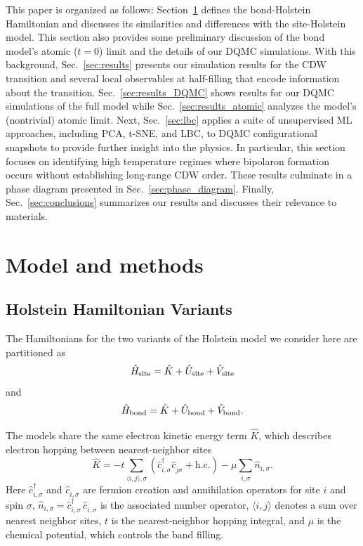 \documentclass[%
reprint,
superscriptaddress,
nofootinbib,
twocolumn,
amsmath,amssymb,
aps,
prb,
]{revtex4-2}
\begin{document}
This paper is organized as follows: Section~\ref{sec:model+methods} defines the bond-Holstein Hamiltonian and discusses its similarities and differences with the site-Holstein model. This section also provides some preliminary discussion of the bond model's atomic ($t=0$) limit and the details of our \gls*{DQMC} simulations. With this background, Sec.~\ref{sec:results} presents our simulation results for the \gls*{CDW} transition and several local observables at half-filling that encode information about the transition. Sec.~\ref{sec:results_DQMC} shows results for our \gls*{DQMC} simulations of the full model while Sec.~\ref{sec:results_atomic} analyzes the model's (nontrivial) atomic limit. Next, Sec.~\ref{sec:lbc} applies a suite of unsupervised \gls*{ML} approaches, including \gls*{PCA}, \gls*{t-SNE}, and \gls*{LBC}, to \gls*{DQMC} configurational snapshots to provide further insight into the physics. In particular, this section focuses on identifying high temperature regimes where bipolaron formation occurs without establishing long-range \gls*{CDW} order. These results culminate in a phase diagram presented in Sec.~\ref{sec:phase_diagram}. Finally, Sec.~\ref{sec:conclusions} summarizes our results and discusses their relevance to materials.

\section{Model and methods}\label{sec:model+methods}
\subsection{Holstein Hamiltonian Variants}\label{subsec:Holstein}

The Hamiltonians for the two variants of the Holstein model we consider here are partitioned as
\begin{equation}\label{eq:H_site}
\hat{H}_{\rm site} = \hat{K} + \hat{U}_{\rm site} + \hat{V}_{\rm site}
\end{equation}
and
\begin{equation}\label{eq:H_bond}
\hat{H}_{\rm bond} = \hat{K} + \hat{U}_{\rm bond} + \hat{V}_{\rm bond}.
\end{equation}

The models share the same electron kinetic energy term $\hat{K}$, which describes electron hopping between nearest-neighbor sites
\begin{equation}\label{eq:hopping}
\hat{K} = -t \sum_{\langle i,j\rangle,\sigma}
\left(\hat{c}^\dagger_{i,\sigma}\hat{c}^{\phantom{\dagger}}_{j\sigma} + \mathrm{h.c.}\right)
-\mu \sum_{i,\sigma} \hat n_{i,\sigma}.
\end{equation}
Here $\hat{c}^\dagger_{i,\sigma}$ and $\hat{c}^{\phantom{\dagger}}_{i,\sigma}$ are fermion creation and annihilation operators for site $i$ and spin $\sigma$, $\hat n_{i,\sigma} = \hat{c}^\dagger_{i,\sigma} \, \hat{c}^{\phantom{\dagger}}_{i,\sigma}$ is the associated number operator, $\langle i,j\rangle$ denotes a sum over nearest neighbor sites, $t$ is the nearest-neighbor hopping integral, and $\mu$ is the chemical potential, which controls the band filling.
\end{document}
